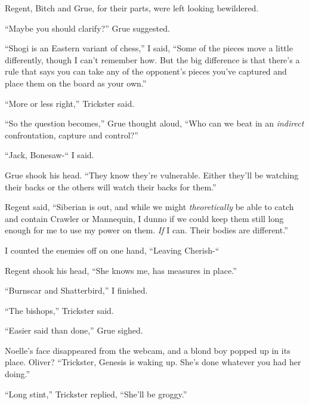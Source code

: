 Regent, Bitch and Grue, for their parts, were left looking bewildered.



``Maybe you should clarify?'' Grue suggested.



``Shogi is an Eastern variant of chess,'' I said, ``Some of the pieces move a little differently, though I can't remember how.  But the big difference is that there's a rule that says you can take any of the opponent's pieces you've captured and place them on the board as your own.''



``More or less right,'' Trickster said.



``So the question becomes,'' Grue thought aloud, ``Who can we beat in an \emph{indirect} confrontation, capture and control?''



``Jack, Bonesaw-`` I said.



Grue shook his head.  ``They know they're vulnerable.  Either they'll be watching their backs or the others will watch their backs for them.''



Regent said, ``Siberian is out, and while we might \emph{theoretically} be able to catch and contain Crawler or Mannequin, I dunno if we could keep them still long enough for me to use my power on them.  \emph{If} I can.  Their bodies are different.''



I counted the enemies off on one hand, ``Leaving Cherish-``



Regent shook his head, ``She knows me, has measures in place.''



``Burnscar and Shatterbird,'' I finished.



``The bishops,'' Trickster said.



``Easier said than done,'' Grue sighed.



Noelle's face disappeared from the webcam, and a blond boy popped up in its place.  Oliver?  ``Trickster, Genesis is waking up.  She's done whatever you had her doing.''



``Long stint,'' Trickster replied, ``She'll be groggy.''



